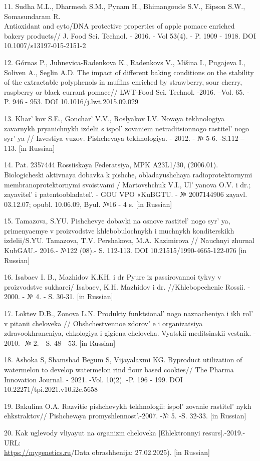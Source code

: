 \begin{references}
11. Sudha M.L., Dharmesh S.M., Pynam H., Bhimangoude S.V., Eipson S.W.,
Somasundaram R. \\Antioxidant and cyto/DNA protective properties of apple
pomace enriched bakery products// J. Food Sci. Technol. - 2016. - Vol
53(4). - P. 1909 - 1918. DOI 10.1007/s13197-015-2151-2

12. Górnas P., Juhnevica-Radenkova K., Radenkovs V., Mišina I., Pugajeva
I., Soliven A., Seglin A.D. The impact of different baking conditions on
the stability of the extractable polyphenols in mufﬁns enriched by
strawberry, sour cherry, raspberry or black currant pomace// LWT-Food
Sci. Technol. -2016. --Vol. 65. - P. 946 - 953. DOI
10.1016/j.lwt.2015.09.029

13. Khar' kov S.E., Gonchar'{} V.V.,
Roslyakov I.V. Novaya tekhnologiya zavarnykh pryanichnykh izdelii s
ispol' zovaniem netraditsionnogo
rastitel' nogo syr' ya // Izvestiya vuzov.
Pishchevaya tekhnologiya. - 2012. - № 5-6. -S.112 -- 113. {[}in
Russian{]}

14. Pat. 2357444 Rossiiskaya Federatsiya, MPK A23L1/30, (2006.01).
Biologicheski aktivnaya dobavka k pishche, obladayushchaya
radioprotektornymi membranoprotektornymi svoistvami / Martovshchuk V.I.,
Ul' yanova O.V. i dr.; zayavitel'{} i
patentoobladatel'. - GOU VPO «KuBGTU. - № 2007144906
zayavl. 03.12.07; opubl. 10.06.09, Byul. №16 - 4 s. {[}in Russian{]}

15. Tamazova, S.YU. Pishchevye dobavki na osnove
rastitel' nogo syr' ya, primenyaemye v
proizvodstve khlebobulochnykh i muchnykh konditerskikh izdelii/S.YU.
Tamazova, T.V. Pershakova, M.A. Kazimirova // Nauchnyi zhurnal KubGAU.-
2016.- №122 (08).- S. 112-113. DOI 10.21515/1990-4665-122-076 {[}in
Russian{]}

16. Isabaev I. B., Mazhidov K.KH. i dr Pyure iz passirovannoi tykvy v
proizvodstve sukharei/ Isabaev, K.H. Mazhidov i dr. //Khlebopechenie
Rossii. - 2000. - № 4. - S. 30-31. {[}in Russian{]}

17. Loktev D.B., Zonova L.N. Produkty funktsional' nogo
naznacheniya i ikh rol'{} v pitanii cheloveka //
Obshchestvennoe zdorov' e i organizatsiya
zdravookhraneniya, ehkologiya i gigiena cheloveka. Vyatskii meditsinskii
vestnik. - 2010. -№ 2. - S. 48 - 53. {[}in Russian{]}

18. Ashoka S, Shamshad Begum S, Vijayalaxmi KG. Byproduct utilization of
watermelon to develop watermelon rind flour based cookies// The Pharma
Innovation Journal. - 2021. -Vol. 10(2). -P. 196 - 199. DOI
10.22271/tpi.2021.v10.i2c.5658

19. Bakulina O.A. Razvitie pishchevykh tekhnologii:
ispol' zovanie rastitel' nykh
ehkstraktov// Pishchevaya promyshlennost'.-2007. -№ 5.
-S. 32-33. {[}in Russian{]}

20. Kak uglevody vliyayut na organizm cheloveka {[}Ehlektronnyi
resurs{]}.-2019.-URL:\\
\href{https://mygenetics.ru/blog/food/kak-uglevody-vliyayut-na-organizm-cheloveka}{https://mygenetics.ru}/Data
obrashhenija: 27.02.2025). {[}in Russian{]}
\end{references}


